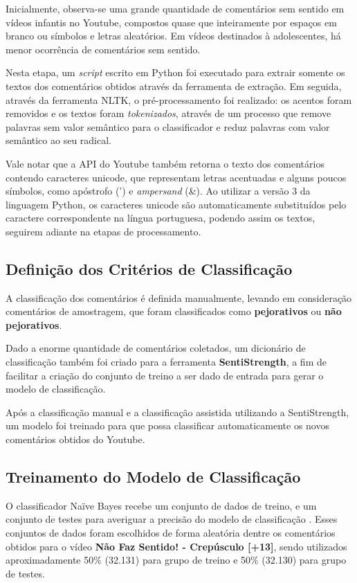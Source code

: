 Inicialmente, observa-se uma grande quantidade de comentários sem sentido em vídeos infantis no Youtube, compostos quase que inteiramente por espaços em branco ou símbolos e letras aleatórios. Em vídeos destinados à adolescentes, há menor ocorrência de comentários sem sentido. 

Nesta etapa, um \textit{script} escrito em Python foi executado para extrair somente os textos dos comentários obtidos através da ferramenta de extração. Em seguida, através da ferramenta NLTK, o pré-processamento foi realizado: os acentos foram removidos e os textos foram \textit{tokenizados}, através de um processo que remove palavras sem valor semântico para o classificador e reduz palavras com valor semântico ao seu radical.

Vale notar que a API do Youtube também retorna o texto dos comentários contendo caracteres unicode, que representam letras acentuadas e alguns poucos símbolos, como apóstrofo (') e \textit{ampersand} (\&). Ao utilizar a versão 3 da linguagem Python, os caracteres unicode são automaticamente substituídos pelo caractere correspondente na língua portuguesa, podendo assim os textos, seguirem adiante na etapas de processamento.


\subsection{Definição dos Critérios de Classificação}

A classificação dos comentários é definida manualmente, levando em consideração comentários de amostragem, que foram classificados como \textbf{pejorativos} ou \textbf{não pejorativos}. 

Dado a enorme quantidade de comentários coletados, um dicionário de classificação também foi criado para a ferramenta \textbf{SentiStrength}, a fim de facilitar a criação do conjunto de treino a ser dado de entrada para gerar o modelo de classificação. %

Após a classificação manual e a classificação assistida utilizando a SentiStrength, um modelo foi treinado para que possa classificar automaticamente os novos comentários obtidos do Youtube.

\subsection{Treinamento do Modelo de Classificação}
O classificador Naïve Bayes recebe um conjunto de dados de treino, e um conjunto de testes para averiguar a precisão do modelo de classificação \cite{ZhangandLi2007Bayes}. Esses conjuntos de dados foram escolhidos de forma aleatória dentre os comentários obtidos para o vídeo \textbf{Não Faz Sentido! - Crepúsculo [+13]}, sendo utilizados aproximadamente 50\% (32.131) para grupo de treino e 50\% (32.130) para grupo de testes. 

